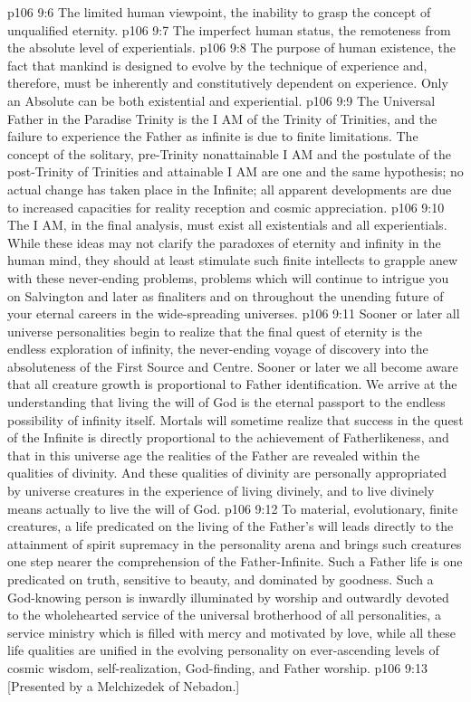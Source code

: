 \vs p106 9:6 \bibnobreakspace The limited human viewpoint, the inability to grasp the concept of unqualified eternity.
\vs p106 9:7 \bibnobreakspace The imperfect human status, the remoteness from the absolute level of experientials.
\vs p106 9:8 \bibnobreakspace The purpose of human existence, the fact that mankind is designed to evolve by the technique of experience and, therefore, must be inherently and constitutively dependent on experience. Only an Absolute can be both existential and experiential.
\vs p106 9:9 \pc The Universal Father in the Paradise Trinity is the I AM of the Trinity of Trinities, and the failure to experience the Father as infinite is due to finite limitations. The concept of the  solitary, pre\hyp{}Trinity nonattainable I AM and the postulate of the  post\hyp{}Trinity of Trinities and attainable I AM are one and the same hypothesis; no actual change has taken place in the Infinite; all apparent developments are due to increased capacities for reality reception and cosmic appreciation.
\vs p106 9:10 The I AM, in the final analysis, must exist  all existentials and  all experientials. While these ideas may not clarify the paradoxes of eternity and infinity in the human mind, they should at least stimulate such finite intellects to grapple anew with these never\hyp{}ending problems, problems which will continue to intrigue you on Salvington and later as finaliters and on throughout the unending future of your eternal careers in the wide\hyp{}spreading universes.
\vs p106 9:11 \pc Sooner or later all universe personalities begin to realize that the final quest of eternity is the endless exploration of infinity, the never\hyp{}ending voyage of discovery into the absoluteness of the First Source and Centre. Sooner or later we all become aware that all creature growth is proportional to Father identification. We arrive at the understanding that living the will of God is the eternal passport to the endless possibility of infinity itself. Mortals will sometime realize that success in the quest of the Infinite is directly proportional to the achievement of Fatherlikeness, and that in this universe age the realities of the Father are revealed within the qualities of divinity. And these qualities of divinity are personally appropriated by universe creatures in the experience of living divinely, and to live divinely means actually to live the will of God.
\vs p106 9:12 To material, evolutionary, finite creatures, a life predicated on the living of the Father’s will leads directly to the attainment of spirit supremacy in the personality arena and brings such creatures one step nearer the comprehension of the Father\hyp{}Infinite. Such a Father life is one predicated on truth, sensitive to beauty, and dominated by goodness. Such a God\hyp{}knowing person is inwardly illuminated by worship and outwardly devoted to the wholehearted service of the universal brotherhood of all personalities, a service ministry which is filled with mercy and motivated by love, while all these life qualities are unified in the evolving personality on ever\hyp{}ascending levels of cosmic wisdom, self\hyp{}realization, God\hyp{}finding, and Father worship.
\vsetoff
\vs p106 9:13 [Presented by a Melchizedek of Nebadon.]
